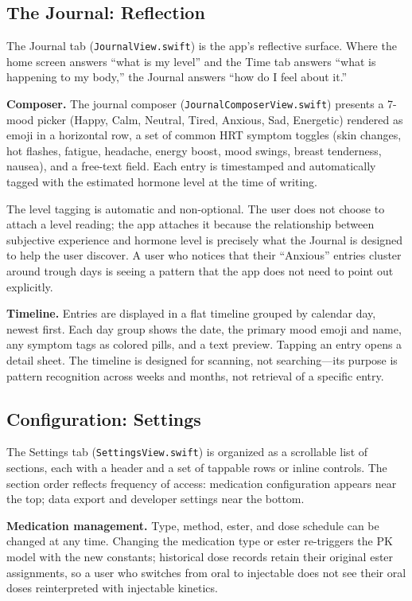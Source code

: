 \documentclass[11pt,a4paper]{article}
\newcommand{\code}[1]{\texttt{\small #1}}
\begin{document}
\subsection{The Journal: Reflection}
\label{sec:journal}

The Journal tab (\code{JournalView.swift}) is the app's reflective
surface. Where the home screen answers ``what is my level'' and the Time
tab answers ``what is happening to my body,'' the Journal answers ``how
do I feel about it.''

\textbf{Composer.} The journal composer
(\code{JournalComposerView.swift}) presents a 7-mood picker
(Happy, Calm, Neutral, Tired, Anxious, Sad, Energetic) rendered as emoji
in a horizontal row, a set of common HRT symptom toggles (skin changes,
hot flashes, fatigue, headache, energy boost, mood swings, breast
tenderness, nausea), and a free-text field. Each entry is timestamped and
automatically tagged with the estimated hormone level at the time of
writing.

The level tagging is automatic and non-optional. The user does not choose
to attach a level reading; the app attaches it because the relationship
between subjective experience and hormone level is precisely what the
Journal is designed to help the user discover. A user who notices that
their ``Anxious'' entries cluster around trough days is seeing a pattern
that the app does not need to point out explicitly.

\textbf{Timeline.} Entries are displayed in a flat timeline grouped by
calendar day, newest first. Each day group shows the date, the primary
mood emoji and name, any symptom tags as colored pills, and a text
preview. Tapping an entry opens a detail sheet. The timeline is designed
for scanning, not searching---its purpose is pattern recognition across
weeks and months, not retrieval of a specific entry.

\subsection{Configuration: Settings}
\label{sec:settings}

The Settings tab (\code{SettingsView.swift}) is organized as a scrollable
list of sections, each with a header and a set of tappable rows or inline
controls. The section order reflects frequency of access: medication
configuration appears near the top; data export and developer settings
near the bottom.

\textbf{Medication management.} Type, method, ester, and dose schedule
can be changed at any time. Changing the medication type or ester
re-triggers the PK model with the new constants; historical dose records
retain their original ester assignments, so a user who switches from oral
to injectable does not see their oral doses reinterpreted with injectable
kinetics.
\end{document}
